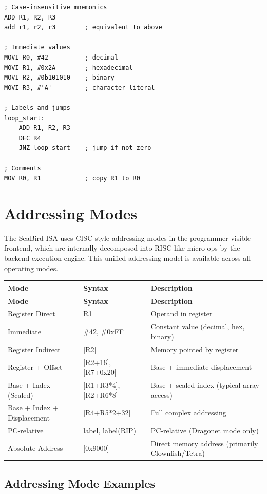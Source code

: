 \documentclass[12pt]{article}
\begin{document}
\begin{lstlisting}
; Case-insensitive mnemonics
ADD R1, R2, R3
add r1, r2, r3        ; equivalent to above

; Immediate values
MOVI R0, #42          ; decimal
MOVI R1, #0x2A        ; hexadecimal
MOVI R2, #0b101010    ; binary
MOVI R3, #'A'         ; character literal

; Labels and jumps
loop_start:
    ADD R1, R2, R3
    DEC R4
    JNZ loop_start    ; jump if not zero

; Comments
MOV R0, R1            ; copy R1 to R0
\end{lstlisting}

\section{Addressing Modes}

The SeaBird ISA uses CISC-style addressing modes in the programmer-visible frontend, which are internally decomposed into RISC-like micro-ops by the backend execution engine. This unified addressing model is available across all operating modes.

\begin{longtable}{@{}lll@{}}
\toprule
\textbf{Mode} & \textbf{Syntax} & \textbf{Description} \\ \midrule
\endfirsthead
\toprule
\textbf{Mode} & \textbf{Syntax} & \textbf{Description} \\ \midrule
\endhead
Register Direct & R1 & Operand in register \\
Immediate & \#42, \#0xFF & Constant value (decimal, hex, binary) \\
Register Indirect & [R2] & Memory pointed by register \\
Register + Offset & [R2+16], [R7+0x20] & Base + immediate displacement \\
Base + Index (Scaled) & [R1+R3*4], [R2+R6*8] & Base + scaled index (typical array access) \\
Base + Index + Displacement & [R4+R5*2+32] & Full complex addressing \\
PC-relative & label, label(RIP) & PC-relative (Dragonet mode only) \\
Absolute Address & [0x9000] & Direct memory address (primarily Clownfish/Tetra) \\ \bottomrule
\end{longtable}

\subsection{Addressing Mode Examples}
\end{document}
